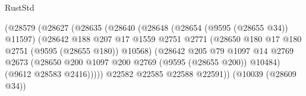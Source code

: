 \begin{lexlean}{RustStd}
\begin{coremodule}
                                              (@28579
                                                (@28627
                                                  (@28635
                                                    (@28640
                                                      (@28648
                                                        (@28654 (@9595 (@28655 @34)) @11597)
                                                        (@28642
                                                          @188
                                                          @207
                                                          @17
                                                          @1559
                                                          @2751
                                                          @2771
                                                          (@28650
                                                            @180
                                                            @17
                                                            @180
                                                            @2751
                                                            (@9595 (@28655 @180))
                                                            @10568)
                                                          (@28642
                                                            @205
                                                            @79
                                                            @1097
                                                            @14
                                                            @2769
                                                            @2673
                                                            (@28650
                                                              @200
                                                              @1097
                                                              @200
                                                              @2769
                                                              (@9595 (@28655 @200))
                                                              @10484)
                                                            (@9612 @28583 @2416)))))
                                                    @22582
                                                    @22585
                                                    @22588
                                                    @22591))
                                                (@10039 (@28609 @34))

\end{coremodule}
\end{lexlean}
